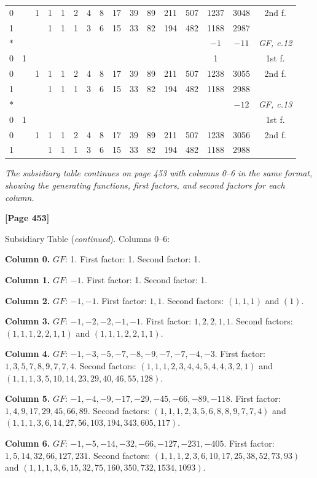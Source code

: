 \documentclass[11pt,a4paper]{book}
\begin{document}
\begin{small}
\begin{longtable}{|c|cccccccccccccc|c|}
\hline
0 & & 1 & 1 & 1 & 2 & 4 & 8 & 17 & 39 & 89 & 211 & 507 & 1237 & 3048 & 2nd f. \\
1 & & & 1 & 1 & 1 & 3 & 6 & 15 & 33 & 82 & 194 & 482 & 1188 & 2987 \\
\hline
$*$ & & & & & & & & & & & & & $-1$ & $-11$ & \textit{GF, c.12} \\
\hline
0 & 1 & & & & & & & & & & & & 1 & & 1st f. \\
\hline
0 & & 1 & 1 & 1 & 2 & 4 & 8 & 17 & 39 & 89 & 211 & 507 & 1238 & 3055 & 2nd f. \\
1 & & & 1 & 1 & 1 & 3 & 6 & 15 & 33 & 82 & 194 & 482 & 1188 & 2988 \\
\hline
$*$ & & & & & & & & & & & & & & $-12$ & \textit{GF, c.13} \\
\hline
0 & 1 & & & & & & & & & & & & & & 1st f. \\
\hline
0 & & 1 & 1 & 1 & 2 & 4 & 8 & 17 & 39 & 89 & 211 & 507 & 1238 & 3056 & 2nd f. \\
1 & & & 1 & 1 & 1 & 3 & 6 & 15 & 33 & 82 & 194 & 482 & 1188 & 2988 \\
\hline
\end{longtable}
\end{small}

\textit{The subsidiary table continues on page 453 with columns 0--6 in the same format, showing the generating functions, first factors, and second factors for each column.}

\newpage
\textbf{[Page 453]}

Subsidiary Table (\textit{continued}). Columns 0--6:

\begin{small}
\noindent\textbf{Column 0.} $GF$: 1. First factor: 1. Second factor: 1.

\noindent\textbf{Column 1.} $GF$: $-1$. First factor: 1. Second factor: 1.

\noindent\textbf{Column 2.} $GF$: $-1,-1$. First factor: $1,1$. Second factors: $(1,1,1)$ and $(1)$.

\noindent\textbf{Column 3.} $GF$: $-1,-2,-2,-1,-1$. First factor: $1,2,2,1,1$.
Second factors: $(1,1,1,2,2,1,1)$ and $(1,1,1,2,2,1,1)$.

\noindent\textbf{Column 4.} $GF$: $-1,-3,-5,-7,-8,-9,-7,-7,-4,-3$.
First factor: $1,3,5,7,8,9,7,7,4$.
Second factors: $(1,1,1,2,3,4,4,5,4,4,3,2,1)$ and $(1,1,1,3,5,10,14,23,29,40,46,55,128)$.

\noindent\textbf{Column 5.} $GF$: $-1,-4,-9,-17,-29,-45,-66,-89,-118$.
First factor: $1,4,9,17,29,45,66,89$.
Second factors: $(1,1,1,2,3,5,6,8,8,9,7,7,4)$ and $(1,1,1,3,6,14,27,56,103,194,343,605,117)$.

\noindent\textbf{Column 6.} $GF$: $-1,-5,-14,-32,-66,-127,-231,-405$.
First factor: $1,5,14,32,66,127,231$.
Second factors: $(1,1,1,2,3,6,10,17,25,38,52,73,93)$ and $(1,1,1,3,6,15,32,75,160,350,732,1534,1093)$.
\end{small}
\end{document}
